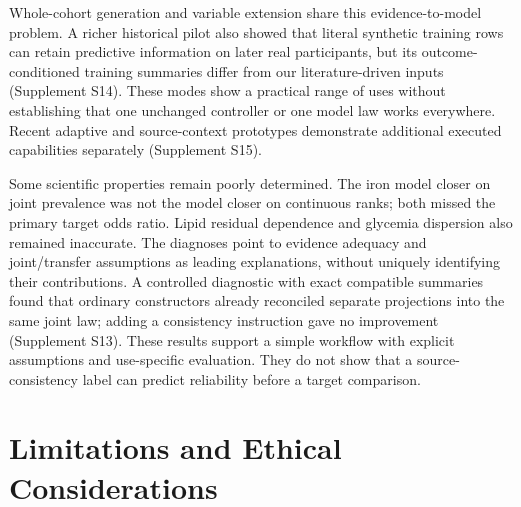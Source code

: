 \documentclass[11pt,letterpaper]{article}
\begin{document}
Whole-cohort generation and variable extension share this evidence-to-model problem. A richer historical pilot also showed that literal synthetic training rows can retain predictive information on later real participants, but its outcome-conditioned training summaries differ from our literature-driven inputs (Supplement S14). These modes show a practical range of uses without establishing that one unchanged controller or one model law works everywhere. Recent adaptive and source-context prototypes demonstrate additional executed capabilities separately (Supplement S15).


Some scientific properties remain poorly determined. The iron model closer on joint prevalence was not the model closer on continuous ranks; both missed the primary target odds ratio. Lipid residual dependence and glycemia dispersion also remained inaccurate. The diagnoses point to evidence adequacy and joint/\allowbreak{}transfer assumptions as leading explanations, without uniquely identifying their contributions. A controlled diagnostic with exact compatible summaries found that ordinary constructors already reconciled separate projections into the same joint law; adding a consistency instruction gave no improvement (Supplement S13). These results support a simple workflow with explicit assumptions and use-specific evaluation. They do not show that a source-consistency label can predict reliability before a target comparison.


\section{Limitations and Ethical Considerations}
\end{document}
